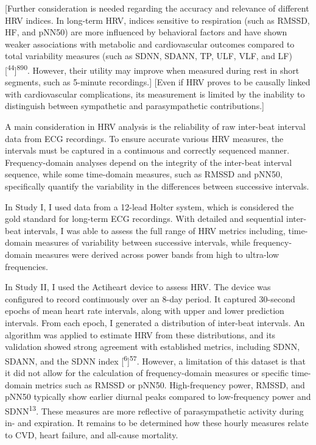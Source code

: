 \documentclass[
  a4paper,
  headsepline=true,
  open=any]{scrbook}
\begin{document}
{[}Further consideration is needed regarding the accuracy and relevance
of different HRV indices. In long-term HRV, indices sensitive to
respiration (such as RMSSD, HF, and pNN50) are more influenced by
behavioral factors and have shown weaker associations with metabolic and
cardiovascular outcomes compared to total variability measures (such as
SDNN, SDANN, TP, ULF, VLF, and
LF){[}\textsuperscript{44}{]}\textsuperscript{8}\textsuperscript{90}.
However, their utility may improve when measured during rest in short
segments, such as 5-minute recordings.{]} {[}Even if HRV proves to be
causally linked with cardiovascular complications, its measurement is
limited by the inability to distinguish between sympathetic and
parasympathetic contributions.{]}

A main consideration in HRV analysis is the reliability of raw
inter-beat interval data from ECG recordings. To ensure accurate various
HRV measures, the intervals must be captured in a continuous and
correctly sequenced manner. Frequency-domain analyses depend on the
integrity of the inter-beat interval sequence, while some time-domain
measures, such as RMSSD and pNN50, specifically quantify the variability
in the differences between successive intervals.

In Study I, I used data from a 12-lead Holter system, which is
considered the gold standard for long-term ECG recordings. With detailed
and sequential inter-beat intervals, I was able to assess the full range
of HRV metrics including, time-domain measures of variability between
successive intervals, while frequency-domain measures were derived
across power bands from high to ultra-low frequencies.

In Study II, I used the Actiheart device to assess HRV. The device was
configured to record continuously over an 8-day period. It captured
30-second epochs of mean heart rate intervals, along with upper and
lower prediction intervals. From each epoch, I generated a distribution
of inter-beat intervals. An algorithm was applied to estimate HRV from
these distributions, and its validation showed strong agreement with
established metrics, including SDNN, SDANN, and the SDNN index
{[}\textsuperscript{6}{]}\textsuperscript{57}. However, a limitation of
this dataset is that it did not allow for the calculation of
frequency-domain measures or specific time-domain metrics such as RMSSD
or pNN50. High-frequency power, RMSSD, and pNN50 typically show earlier
diurnal peaks compared to low-frequency power and
SDNN\textsuperscript{13}. These measures are more reflective of
parasympathetic activity during in- and expiration. It remains to be
determined how these hourly measures relate to CVD, heart failure, and
all-cause mortality.
\end{document}
